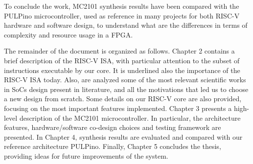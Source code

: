 To conclude the work, MC2101 synthesis results have been compared with the PULPino microcontroller, used as reference in many projects for both RISC-V hardware and software design, to understand what are the differences in terms of complexity and resource usage in a FPGA.

The remainder of the document is organized as follows. Chapter 2 contains a brief description of the RISC-V ISA, with particular attention to the subset of instructions executable by our core. It is underlined also the importance of the RISC-V ISA today. Also, are analyzed some of the most relevant scientific works in SoCs design present in literature, and all the motivations that led us to choose a new design from scratch. Some details on our RISC-V core are also provided, focusing on the most important features implemented. Chapter 3 presents a high-level description of the MC2101 microcontroller. In particular, the architecture features, hardware/software co-design choices and testing framework are presented. In Chapter 4, synthesis results are evaluated and compared with our reference architecture PULPino. Finally, Chapter 5 concludes the thesis, providing ideas for future improvements of the system.
